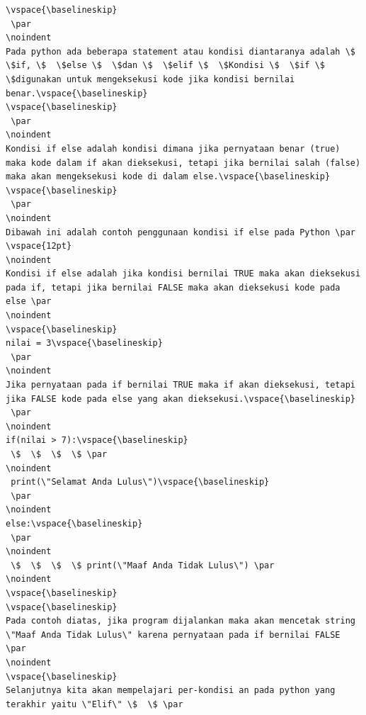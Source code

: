 \begin{verbatim}
\vspace{\baselineskip}
 \par
\noindent 
Pada python ada beberapa statement atau kondisi diantaranya adalah \$  \$if, \$  \$else \$  \$dan \$  \$elif \$  \$Kondisi \$  \$if \$  \$digunakan untuk mengeksekusi kode jika kondisi bernilai benar.\vspace{\baselineskip}
\vspace{\baselineskip}
 \par
\noindent 
Kondisi if else adalah kondisi dimana jika pernyataan benar (true) maka kode dalam if akan dieksekusi, tetapi jika bernilai salah (false) maka akan mengeksekusi kode di dalam else.\vspace{\baselineskip}
\vspace{\baselineskip}
 \par
\noindent 
Dibawah ini adalah contoh penggunaan kondisi if else pada Python \par
\vspace{12pt}
\noindent 
Kondisi if else adalah jika kondisi bernilai TRUE maka akan dieksekusi pada if, tetapi jika bernilai FALSE maka akan dieksekusi kode pada else \par
\noindent 
\vspace{\baselineskip}
nilai = 3\vspace{\baselineskip}
 \par
\noindent 
Jika pernyataan pada if bernilai TRUE maka if akan dieksekusi, tetapi jika FALSE kode pada else yang akan dieksekusi.\vspace{\baselineskip}
 \par
\noindent 
if(nilai > 7):\vspace{\baselineskip}
 \$  \$  \$  \$ \par
\noindent 
 print(\"Selamat Anda Lulus\")\vspace{\baselineskip}
 \par
\noindent 
else:\vspace{\baselineskip}
 \par
\noindent 
 \$  \$  \$  \$ print(\"Maaf Anda Tidak Lulus\") \par
\noindent 
\vspace{\baselineskip}
\vspace{\baselineskip}
Pada contoh diatas, jika program dijalankan maka akan mencetak string \"Maaf Anda Tidak Lulus\" karena pernyataan pada if bernilai FALSE \par
\noindent 
\vspace{\baselineskip}
Selanjutnya kita akan mempelajari per-kondisi an pada python yang terakhir yaitu \"Elif\" \$  \$ \par

\end{verbatim}
